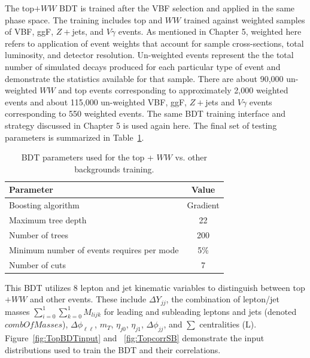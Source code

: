 The top$+WW$ BDT is trained after the VBF selection and applied in the same phase space. The training includes top and $WW$ trained against weighted samples of VBF, ggF, $Z+$jets, and $V\gamma$ events. As mentioned in Chapter 5, weighted here refers to application of event weights that account for sample cross-sections, total luminosity, and detector resolution. Un-weighted events represent the the total number of simulated decays produced for each particular type of event and demonstrate the statistics available for that sample. There are about 90,000 un-weighted $WW$ and top events corresponding to approximately 2,000 weighted events and about 115,000 un-weighted VBF, ggF, $Z+$jets and $V\gamma$ events corresponding to 550 weighted events. The same BDT training interface and strategy discussed in Chapter 5 is used again here. The final set of testing parameters is summarized in Table~\ref{tab:TopBDTparameters}.

\begin{table}[h!]
\centering
\begin{tabular}{|l|c|}
\hline
Parameter                                    & Value     \\
\hline
Boosting algorithm                           &  Gradient  \\
Maximum tree depth                           &  22       \\
Number of trees                              &  200     \\
Minimum number of events requires per mode   &  5\%      \\
Number of cuts                               &  7        \\
\hline
\end{tabular}
\caption{BDT parameters used for the top + $WW$ vs. other backgrounds training.} 
\label{tab:TopBDTparameters}
\end{table}

This BDT utilizes 8 lepton and jet kinematic variables to distinguish between top$+WW$ and other events. These include $\Delta Y_{jj}$, the combination of lepton/jet masses $\sum_{i=0}^1\sum_{k=0}^1 M_{lijk}$ for leading and subleading leptons and jets (denoted $combOfMasses$), $\Delta \phi_{\ell\ell}$, $m_T$, $\eta_{j0}$, $\eta_{j1}$, $\Delta \phi_{jj}$, and $\sum$ centralities (L). Figure~\ref{fig:TopBDTinput} and ~\ref{fig:TopcorrSB} demonstrate the input distributions used to train the BDT and their correlations.

